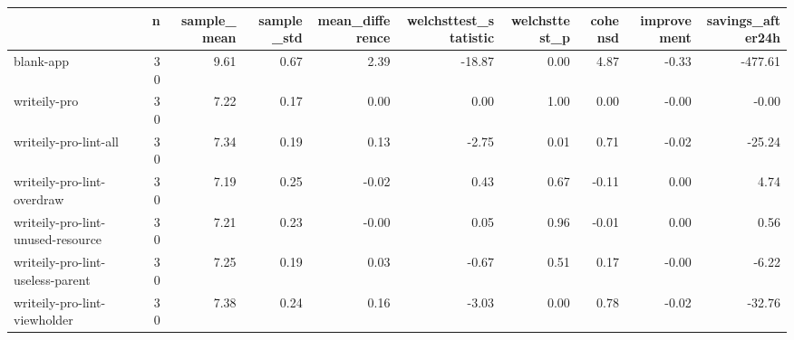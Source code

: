 \begin{tabular}{lrrrrrrrrr}
\toprule
{} &   n &  sample\_mean &  sample\_std &  mean\_difference &  welchsttest\_statistic &  welchsttest\_p &  cohensd &  improvement &  savings\_after24h \\
\midrule
blank-app                         &  30 &         9.61 &        0.67 &             2.39 &                 -18.87 &           0.00 &     4.87 &        -0.33 &           -477.61 \\
writeily-pro                      &  30 &         7.22 &        0.17 &             0.00 &                   0.00 &           1.00 &     0.00 &        -0.00 &             -0.00 \\
writeily-pro-lint-all             &  30 &         7.34 &        0.19 &             0.13 &                  -2.75 &           0.01 &     0.71 &        -0.02 &            -25.24 \\
writeily-pro-lint-overdraw        &  30 &         7.19 &        0.25 &            -0.02 &                   0.43 &           0.67 &    -0.11 &         0.00 &              4.74 \\
writeily-pro-lint-unused-resource &  30 &         7.21 &        0.23 &            -0.00 &                   0.05 &           0.96 &    -0.01 &         0.00 &              0.56 \\
writeily-pro-lint-useless-parent  &  30 &         7.25 &        0.19 &             0.03 &                  -0.67 &           0.51 &     0.17 &        -0.00 &             -6.22 \\
writeily-pro-lint-viewholder      &  30 &         7.38 &        0.24 &             0.16 &                  -3.03 &           0.00 &     0.78 &        -0.02 &            -32.76 \\
\bottomrule
\end{tabular}
